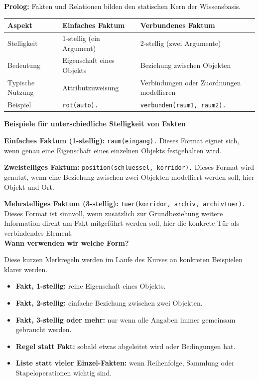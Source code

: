 \documentclass[parskip=half,a4paper,11pt]{scrreprt}
\begin{document}
\textbf{Prolog:} Fakten und Relationen bilden den statischen Kern der Wissensbasis.

\begin{center}
\begin{tabular}{p{}p{}p{}}
\toprule
\textbf{Aspekt} & \textbf{Einfaches Faktum} & \textbf{Verbundenes Faktum} \\
\midrule
Stelligkeit & 1-stellig (ein Argument) & 2-stellig (zwei Argumente) \\
Bedeutung & Eigenschaft eines Objekts & Beziehung zwischen Objekten \\
Typische Nutzung & Attributzuweisung & Verbindungen oder Zuordnungen modellieren \\
Beispiel & \texttt{rot(auto).} & \texttt{verbunden(raum1, raum2).} \\
\bottomrule
\end{tabular}
\end{center}

\textbf{Beispiele für unterschiedliche Stelligkeit von Fakten}

\textbf{Einfaches Faktum (1-stellig):} \texttt{raum(eingang).}
Dieses Format eignet sich, wenn genau eine Eigenschaft eines einzelnen Objekts festgehalten wird.

\textbf{Zweistelliges Faktum:} \texttt{position(schluessel, korridor).}
Dieses Format wird genutzt, wenn eine Beziehung zwischen zwei Objekten modelliert werden soll, hier Objekt und Ort.

\textbf{Mehrstelliges Faktum (3-stellig):} \texttt{tuer(korridor, archiv, archivtuer).}
Dieses Format ist sinnvoll, wenn zusätzlich zur Grundbeziehung weitere Information direkt am Fakt mitgeführt werden soll, hier die konkrete Tür als verbindendes Element.\\

\textbf{Wann verwenden wir welche Form?}

Diese kurzen Merkregeln werden im Laufe des Kurses an konkreten Beispielen klarer werden.

\begin{itemize}
    \item \textbf{Fakt, 1-stellig:} reine Eigenschaft eines Objekts.
    \item \textbf{Fakt, 2-stellig:} einfache Beziehung zwischen zwei Objekten.
    \item \textbf{Fakt, 3-stellig oder mehr:} nur wenn alle Angaben immer gemeinsam gebraucht werden.
    \item \textbf{Regel statt Fakt:} sobald etwas abgeleitet wird oder Bedingungen hat.
    \item \textbf{Liste statt vieler Einzel-Fakten:} wenn Reihenfolge, Sammlung oder Stapeloperationen wichtig sind.
\end{itemize}
\end{document}
